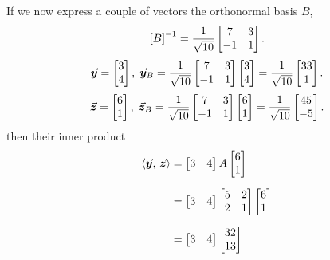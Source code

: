 \documentclass[../MathsNotesBase.tex]{subfiles}
\begin{document}
{\begin{exe}
{				If we now express a couple of vectors \wrt the orthonormal basis $B$,
				\[ {[B]}^{-1} = \frac{1}{\sqrt{10}} \begin{bmatrix}7 & 3 \\ -1 & 1\end{bmatrix}. \]
				\[ 
				\vec{\bm{y}} = \begin{bmatrix}3 \\ 4\end{bmatrix}, \; 
				\vec{\bm{y}}_B = \frac{1}{\sqrt{10}} \begin{bmatrix}7 & 3 \\ -1 & 1\end{bmatrix} \begin{bmatrix}3 \\ 4\end{bmatrix} = 
				\frac{1}{\sqrt{10}} \begin{bmatrix}33 \\ 1\end{bmatrix}. 
				\]
				\[ 
				\vec{\bm{z}} = \begin{bmatrix}6 \\ 1\end{bmatrix}, \; 
				\vec{\bm{z}}_B = \frac{1}{\sqrt{10}} \begin{bmatrix}7 & 3 \\ -1 & 1\end{bmatrix} \begin{bmatrix}6 \\ 1\end{bmatrix} = 
				\frac{1}{\sqrt{10}} \begin{bmatrix}45 \\ -5\end{bmatrix}. 
				\]
				then their inner product
				\[\begin{aligned}
					\inner{\y}{\z} &= \begin{bmatrix}3 & 4\end{bmatrix} A \begin{bmatrix}6 \\ 1\end{bmatrix} \nn
					&= \begin{bmatrix}3 & 4\end{bmatrix} \begin{bmatrix} 5 & 2\\ 2 & 1 \end{bmatrix} \begin{bmatrix}6 \\ 1\end{bmatrix} \nn
					&= \begin{bmatrix}3 & 4\end{bmatrix} \begin{bmatrix} 32 \\ 13 \end{bmatrix} \nn

\end{aligned}\]}
\end{exe}}
\end{document}
